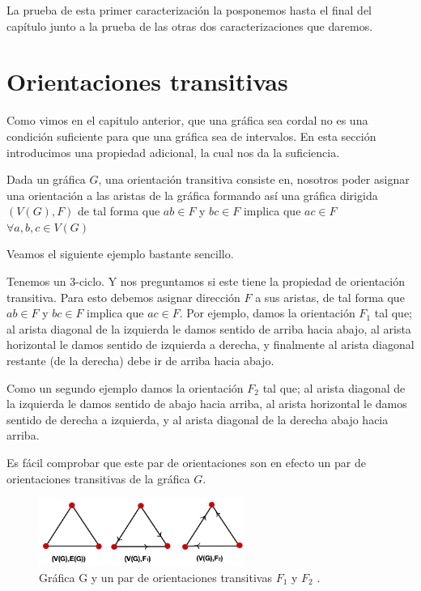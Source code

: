 La prueba de esta primer caracterización la posponemos hasta el final del capítulo junto a la prueba de las otras dos caracterizaciones que daremos.

\section{Orientaciones transitivas}
Como vimos en el capitulo anterior, que una gráfica sea cordal no es una condición suficiente para que una gráfica sea de intervalos. En esta sección introducimos una propiedad adicional, la cual nos da la suficiencia.

Dada un gráfica $G$, una orientación transitiva consiste en, nosotros poder asignar una orientación a las aristas de la gráfica formando así una gráfica dirigida $(V(G),F)$ de tal forma que $ab\in F$ y $bc\in F$ implica que $ac\in F$ $\forall a,b,c \in V(G)$

Veamos el siguiente ejemplo bastante sencillo.

Tenemos un 3-ciclo. Y nos preguntamos si este tiene la propiedad de orientación transitiva. Para esto debemos asignar dirección $F$ a sus aristas, de tal forma que $ab\in F$ y $bc\in F$ implica que $ac\in F$.
Por ejemplo, damos la orientación $F_1$ tal que; al arista diagonal de la izquierda le damos sentido de arriba hacia abajo, al arista horizontal le damos sentido de izquierda a derecha, y finalmente al arista diagonal restante (de la derecha) debe ir de arriba hacia abajo.
    
Como un segundo ejemplo damos la orientación $F_2$ tal que; al arista diagonal de la izquierda le damos sentido de abajo hacia arriba, al arista horizontal le damos sentido de derecha a izquierda, y al arista diagonal de la derecha abajo hacia arriba.

Es fácil comprobar que este par de orientaciones son en efecto un par de orientaciones transitivas de la gráfica $G$.


\begin{figure}[H]
  \centering
  \includegraphics[width=0.6\textwidth]{recursos/capturas/205.jpg}
  \caption{ Gráfica G y un par de orientaciones transitivas $F_1$ y $F_2$ .}
  \label{fig:205}
\end{figure}

